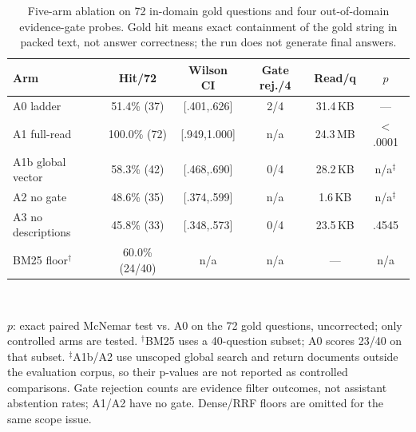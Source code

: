 \documentclass[sigconf]{acmart}
\begin{document}




\begin{table}[t]
\caption{Five-arm ablation on 72 in-domain gold questions and four
out-of-domain evidence-gate probes. Gold hit means exact containment of
the gold string in packed text, not answer correctness; the run does not
generate final answers.}
\label{tab:ablation}
\footnotesize
\setlength{\tabcolsep}{2.7pt}
\begin{tabular}{@{}lccccc@{}}
\toprule
\textbf{Arm} & \textbf{Hit/72} & \textbf{Wilson CI} & \textbf{Gate rej./4} &
\textbf{Read/q} & \textbf{$p$} \\
\midrule
A0 ladder          & 51.4\% (37) & [.401,.626] & 2/4 & 31.4\,KB    & --- \\
A1 full-read       & 100.0\% (72) & [.949,1.000] & n/a & 24.3\,MB & $<$.0001 \\
A1b global vector  & 58.3\% (42) & [.468,.690] & 0/4 & 28.2\,KB    & n/a$^\ddagger$ \\
A2 no gate         & 48.6\% (35) & [.374,.599] & n/a & 1.6\,KB     & n/a$^\ddagger$ \\
A3 no descriptions & 45.8\% (33) & [.348,.573] & 0/4 & 23.5\,KB    & .4545 \\
\midrule
BM25 floor$^\dagger$ & 60.0\% (24/40) & n/a & n/a & --- & n/a \\
\bottomrule
\end{tabular}
\\[-2pt]\parbox{\columnwidth}{\scriptsize $p$: exact paired McNemar
test vs. A0 on the 72 gold questions, uncorrected; only controlled arms
are tested. $^\dagger$BM25 uses a 40-question subset; A0 scores 23/40 on
that subset. $^\ddagger$A1b/A2 use unscoped global search and return
documents outside the evaluation corpus, so their p-values are not
reported as controlled comparisons. Gate rejection counts are evidence
filter outcomes, not assistant abstention rates; A1/A2 have no gate.
Dense/RRF floors are omitted for the same scope issue.}
\end{table}





\end{document}
